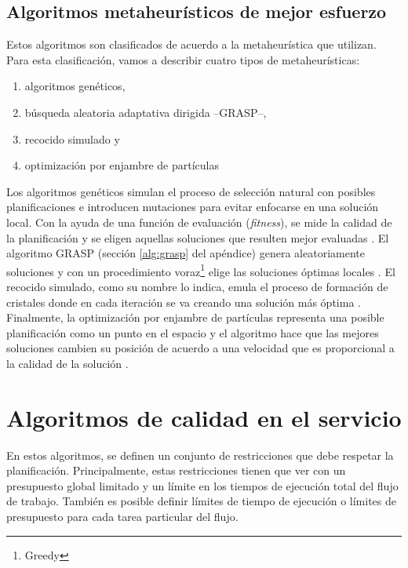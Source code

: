 \subsection{Algoritmos metaheurísticos de mejor esfuerzo}

Estos algoritmos son clasificados de acuerdo a la metaheurística que utilizan. Para esta clasificación, vamos a describir cuatro tipos de metaheurísticas: 

\begin{enumerate}
\item{algoritmos genéticos,}
\item{búsqueda aleatoria adaptativa dirigida --GRASP--,}
\item{recocido simulado y}
\item{optimización por enjambre de partículas}
\end{enumerate}

Los algoritmos genéticos simulan el proceso de selección natural con posibles planificaciones e introducen mutaciones para evitar enfocarse en una solución local. Con la ayuda de una función de evaluación (\emph{fitness}), se mide la calidad de la planificación y se eligen aquellas soluciones que resulten mejor evaluadas \cite{yu2006scheduling}. El algoritmo GRASP (sección \ref{alg:grasp} del apéndice) genera aleatoriamente soluciones y con un procedimiento voraz\footnote{Greedy} elige las soluciones óptimas locales \cite{blythe2005task}. El recocido simulado, como su nombre lo indica, emula el proceso de formación de cristales donde en cada iteración se va creando una solución más óptima \cite{young2003scheduling}. Finalmente, la optimización por enjambre de partículas representa una posible planificación como un punto en el espacio y el algoritmo hace que las mejores soluciones cambien su posición de acuerdo a una velocidad que es proporcional a la calidad de la solución \cite{wu2010revised}.

\section{Algoritmos de calidad en el servicio}
En estos algoritmos, se definen un conjunto de restricciones que debe respetar la planificación. Principalmente, estas restricciones tienen que ver con un presupuesto global limitado y un límite en los tiempos de ejecución total del flujo de trabajo. También es posible definir límites de tiempo de ejecución o límites de presupuesto para cada tarea particular del flujo.

